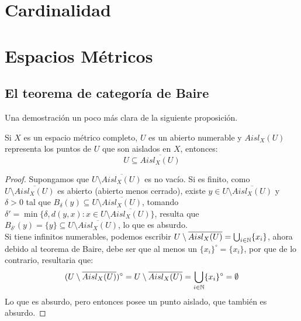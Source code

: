 \documentclass[12pt,a4paper]{book}
\begin{document}
\chapter{Cardinalidad}


\newpage

\newpage

\newpage


\chapter{Espacios Métricos}


\newpage

\newpage

\newpage

\newpage




\section{El teorema de categoría de Baire}
Una demostración un poco más clara de la siguiente proposición.
\begin{prop}
Si $X$ es un espacio métrico completo, $U$ es un abierto numerable y $Aisl_X(U)$ representa los puntos de $U$ que son aislados en $X$, entonces:
$$ U \subseteq \overline{Aisl_X(U)}$$
\begin{proof}
Supongamos que $U \setminus \overline{Aisl_X(U)}$ es no vacío. Si es finito, como $U \setminus \overline{Aisl_X(U)}$ es abierto (abierto menos cerrado), existe $y \in U \setminus \overline{Aisl_X(U)}$ y $\delta > 0 $ tal que $B_{\delta}(y)\subseteq U \setminus \overline{Aisl_X(U)}$, tomando $\delta' = \min\{\delta , d(y,x): x \in U \setminus \overline{Aisl_X(U)}\}$, resulta que $B_{\delta'}(y)=\{y\} \subseteq U \setminus \overline{Aisl_X(U)}$, lo que es absurdo. \\
Si tiene infinitos numerables, podemos escribir $U \setminus \overline{Aisl_X(U)} = \bigcup_{i \in \mathbb{N}} \{x_i\}$, ahora debido al teorema de Baire, debe ser que al menos un $\{x_i\}^{\circ} = \{x_i\}$, por que de lo contrario, resultaria que:
$$ (U \setminus \overline{Aisl_X(U)})^{\circ} = U \setminus \overline{Aisl_X(U)} = \bigcup_{i \in \mathbb{N}} \{x_i\}^{\circ} = \emptyset$$
Lo que es absurdo, pero entonces posee un punto aislado, que también es absurdo.
\end{proof}
\end{prop}
\end{document}
